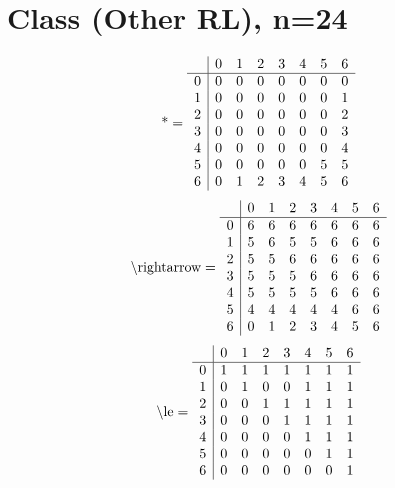 \documentclass[11pt]{article}
\begin{document}
\section{Class (Other RL), n=24}
\[\text{*} = 
\begin{array}{r | r r r r r r r}
 & 0 & 1 & 2 & 3 & 4 & 5 & 6 \\ \hline
0 & 0 & 0 & 0 & 0 & 0 & 0 & 0 \\
1 & 0 & 0 & 0 & 0 & 0 & 0 & 1 \\
2 & 0 & 0 & 0 & 0 & 0 & 0 & 2 \\
3 & 0 & 0 & 0 & 0 & 0 & 0 & 3 \\
4 & 0 & 0 & 0 & 0 & 0 & 0 & 4 \\
5 & 0 & 0 & 0 & 0 & 0 & 5 & 5 \\
6 & 0 & 1 & 2 & 3 & 4 & 5 & 6 \\
\end{array}
\]
\[\text{\textbackslash rightarrow} = 
\begin{array}{r | r r r r r r r}
 & 0 & 1 & 2 & 3 & 4 & 5 & 6 \\ \hline
0 & 6 & 6 & 6 & 6 & 6 & 6 & 6 \\
1 & 5 & 6 & 5 & 5 & 6 & 6 & 6 \\
2 & 5 & 5 & 6 & 6 & 6 & 6 & 6 \\
3 & 5 & 5 & 5 & 6 & 6 & 6 & 6 \\
4 & 5 & 5 & 5 & 5 & 6 & 6 & 6 \\
5 & 4 & 4 & 4 & 4 & 4 & 6 & 6 \\
6 & 0 & 1 & 2 & 3 & 4 & 5 & 6 \\
\end{array}
\]
\[\text{\textbackslash le} = 
\begin{array}{r | r r r r r r r}
 & 0 & 1 & 2 & 3 & 4 & 5 & 6 \\ \hline
0 & 1 & 1 & 1 & 1 & 1 & 1 & 1 \\
1 & 0 & 1 & 0 & 0 & 1 & 1 & 1 \\
2 & 0 & 0 & 1 & 1 & 1 & 1 & 1 \\
3 & 0 & 0 & 0 & 1 & 1 & 1 & 1 \\
4 & 0 & 0 & 0 & 0 & 1 & 1 & 1 \\
5 & 0 & 0 & 0 & 0 & 0 & 1 & 1 \\
6 & 0 & 0 & 0 & 0 & 0 & 0 & 1 \\
\end{array}
\]
\end{document}
